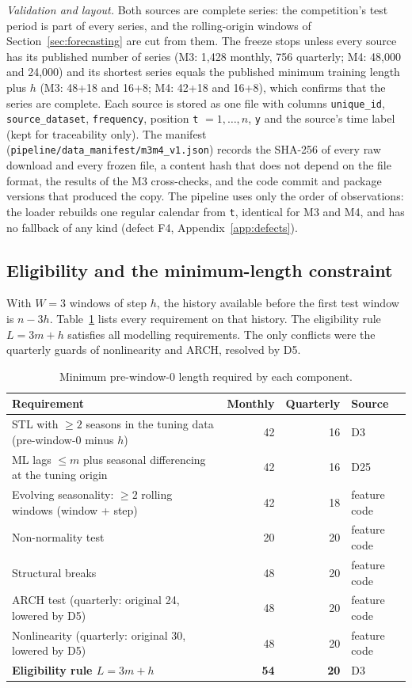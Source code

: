 \documentclass[11pt,a4paper]{article}
\newcommand{\code}[1]{\texttt{#1}}
\begin{document}
\emph{Validation and layout.} Both sources are complete series: the competition's test period is part
of every series, and the rolling-origin windows of Section~\ref{sec:forecasting} are cut from them.
The freeze stops unless every source has its published number of series (M3: 1,428 monthly, 756
quarterly; M4: 48,000 and 24,000) and its shortest series equals the published minimum training
length plus $h$ (M3: 48+18 and 16+8; M4: 42+18 and 16+8), which confirms that the series are
complete. Each source is stored as one file with columns \code{unique_id}, \code{source_dataset},
\code{frequency}, position \code{t} $=1,\dots,n$, \code{y} and the source's time label (kept for
traceability only). The manifest (\mbox{\code{pipeline/data_manifest/m3m4_v1.json}}) records the SHA-256 of
every raw download and every frozen file, a content hash that does not depend on the file format,
the results of the M3 cross-checks, and the code commit and package versions that produced the copy.
The pipeline uses only the order of observations: the loader rebuilds one regular calendar from
\code{t}, identical for M3 and M4, and has no fallback of any kind (defect F4,
Appendix~\ref{app:defects}).

\subsection{Eligibility and the minimum-length constraint}\label{sec:eligibility}

With $W=3$ windows of step $h$, the history available before the first test window is $n - 3h$.
Table~\ref{tab:minlen} lists every requirement on that history. The eligibility rule $L = 3m+h$
satisfies all modelling requirements. The only conflicts were the quarterly guards of nonlinearity
and ARCH, resolved by D5.

\begin{table}[h]
\centering\small
\caption{Minimum pre-window-0 length required by each component.}\label{tab:minlen}
\begin{tabular}{@{}lrrl@{}}
\toprule
Requirement & Monthly & Quarterly & Source \\
\midrule
STL with $\geq 2$ seasons in the tuning data (pre-window-0 minus $h$) & 42 & 16 & D3 \\
ML lags $\leq m$ plus seasonal differencing at the tuning origin & 42 & 16 & D25 \\
Evolving seasonality: $\geq 2$ rolling windows (window + step) & 42 & 18 & feature code \\
Non-normality test & 20 & 20 & feature code \\
Structural breaks & 48 & 20 & feature code \\
ARCH test (quarterly: original 24, lowered by D5) & 48 & 20 & feature code \\
Nonlinearity (quarterly: original 30, lowered by D5) & 48 & 20 & feature code \\
\midrule
\textbf{Eligibility rule $L = 3m+h$} & \textbf{54} & \textbf{20} & D3 \\
\bottomrule
\end{tabular}
\end{table}
\end{document}
